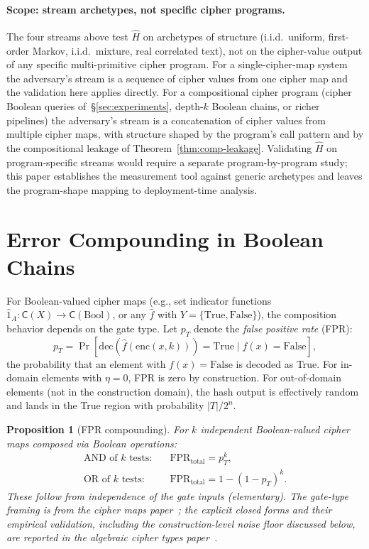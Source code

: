 \documentclass[conference]{IEEEtran}
\theoremstyle{definition}
\theoremstyle{plain}
\newtheorem{proposition}[theorem]{Proposition}
\theoremstyle{remark}
\newcommand{\fhat}{\hat{f}}
\newcommand{\enc}{\mathrm{enc}}
\newcommand{\dec}{\mathrm{dec}}
\newcommand{\cipher}[1]{\mathsf{C}(#1)}
\begin{document}
\paragraph{Scope: stream archetypes, not specific cipher programs.}
The four streams above test $\hat H$ on archetypes of structure
(i.i.d.\ uniform, first-order Markov, i.i.d.\ mixture, real
correlated text), not on the cipher-value output of any specific
multi-primitive cipher program.  For a single-cipher-map system
the adversary's stream is a sequence of cipher values from one
cipher map and the validation here applies directly.  For a
compositional cipher program (cipher Boolean queries
of~\S\ref{sec:experiments}, depth-$k$ Boolean chains, or richer
pipelines) the adversary's stream is a concatenation of cipher
values from multiple cipher maps, with structure shaped by the
program's call pattern and by the compositional leakage of
Theorem~\ref{thm:comp-leakage}.  Validating $\hat H$ on
program-specific streams would require a separate
program-by-program study; this paper establishes the measurement
tool against generic archetypes and leaves the program-shape
mapping to deployment-time analysis.




\section{Error Compounding in Boolean Chains}
\label{app:boolean}
\label{subsec:fpr-compounding}

For Boolean-valued cipher maps (e.g., set indicator functions
$\hat{1}_A : \cipher{X} \to \cipher{\mathrm{Bool}}$, or any
$\fhat$ with $Y = \{\mathrm{True}, \mathrm{False}\}$), the
composition behavior depends on the gate type.  Let $p_T$ denote the
\emph{false positive rate} (FPR):
\[
p_T = \Pr[\dec(\fhat(\enc(x,k))) = \mathrm{True} \mid f(x) = \mathrm{False}],
\]
the probability that an element with $f(x) = \mathrm{False}$ is
decoded as True.
For in-domain elements with $\eta = 0$, FPR is zero by construction.
For out-of-domain elements (not in the construction domain), the hash
output is effectively random and lands in the True region with
probability $|T|/2^n$.

\begin{proposition}[FPR compounding]
\label{thm:fpr-compounding}
For $k$ independent Boolean-valued cipher maps composed via Boolean
operations:
\begin{align}
\text{AND of } k \text{ tests:} &\quad
  \mathrm{FPR}_{\mathrm{total}} = p_T^k, \\
\text{OR of } k \text{ tests:} &\quad
  \mathrm{FPR}_{\mathrm{total}} = 1 - (1 - p_T)^k.
\end{align}
These follow from independence of the gate inputs (elementary).  The
gate-type framing is from the cipher maps
paper~\cite[Sec.~7.4]{towell2026cipher}; the explicit closed forms and
their empirical validation, including the construction-level noise
floor discussed below, are reported in the algebraic cipher types
paper~\cite[Table~3]{towell2026algebraic}.
\end{proposition}
\end{document}
